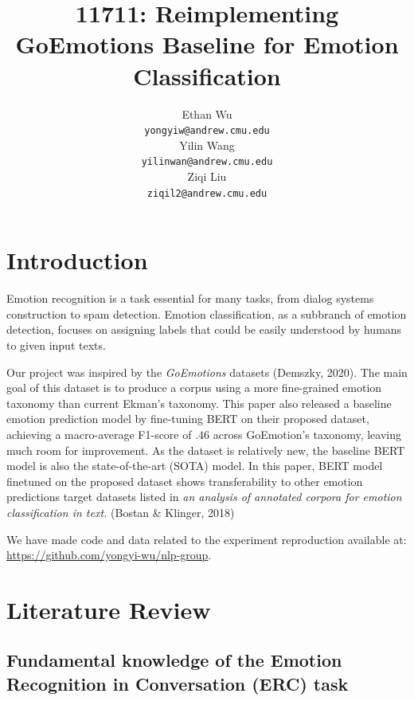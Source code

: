 \documentclass{article}
\title{11711: Reimplementing GoEmotions Baseline for Emotion Classification}
\author{%
  Ethan Wu \\
  \texttt{yongyiw@andrew.cmu.edu} \\
  \And Yilin Wang \\
  \texttt{yilinwan@andrew.cmu.edu} \\
  \And Ziqi Liu \\
  \texttt{ziqil2@andrew.cmu.edu} \\
}
\begin{document}
\maketitle



\section{Introduction}

Emotion recognition is a task essential for many tasks, from dialog systems construction to spam detection. Emotion classification, as a subbranch of emotion detection, focuses on assigning labels that could be easily understood by humans to given input texts. 

Our project was inspired by the \textit{GoEmotions} datasets (Demszky, 2020)\cite{main}. The main goal of this dataset is to produce a corpus using a more fine-grained emotion taxonomy than current Ekman's taxonomy. This paper also released a baseline emotion prediction model by fine-tuning BERT on their proposed dataset, achieving a macro-average F1-score of $.46$ across GoEmotion's taxonomy, leaving much room for improvement. As the dataset is relatively new, the baseline BERT model is also the state-of-the-art (SOTA) model. In this paper, BERT model finetuned on the proposed dataset shows transferability to other emotion predictions target datasets listed in \emph{an analysis of annotated corpora for emotion classification in text. } (Bostan \& Klinger, 2018) \cite{Unified}

We have made code and data related to the experiment reproduction available at: \href{https://github.com/yongyi-wu/nlp-group}{https://github.com/yongyi-wu/nlp-group}. 


\section{Literature Review}
\label{lit}

\subsection{Fundamental knowledge of the Emotion Recognition in Conversation (ERC) task}
\end{document}
